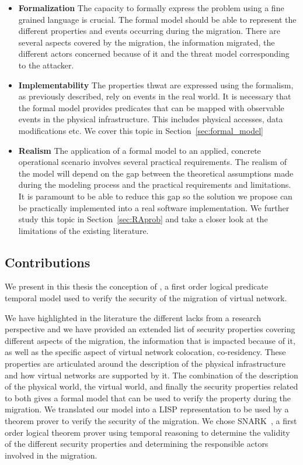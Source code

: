 \begin{itemize}
    \item \textbf{Formalization } The capacity to formally express the problem using a fine grained language is crucial. The formal model should be able to represent the different properties and events occurring during the migration.
    There are several aspects covered by the migration, the information migrated, the different actors concerned because of it and the threat model corresponding to the attacker.
    
    \item \textbf{Implementability } The properties thwat are expressed using the formalism, as previously described, rely on events in the real world. It is necessary that the formal model provides predicates that can be mapped with observable events in the physical infrastructure. This includes physical accesses, data modifications etc. We cover this topic in Section~\ref{sec:formal_model}
    
    \item \textbf{Realism } The application of a formal model to an applied, concrete operational scenario involves several practical requirements. The realism of the model will depend on the gap between the theoretical assumptions made during the modeling process and the practical requirements and limitations. It is paramount to be able to reduce this gap so the solution we propose can be practically implemented into a real software implementation. We further study this topic in Section~\ref{sec:RAprob} and take a closer look at the limitations of the existing literature. 
    
\end{itemize}


\subsection{Contributions}
We present in this thesis the conception of , a first order logical predicate temporal model used to verify the security of the migration of virtual network. 

We have highlighted in the literature the different lacks from a research perspective and we have provided an extended list of security properties covering different aspects of the migration, the information that is impacted because of it, as well as the specific aspect of virtual network colocation, \ie co-residency. These properties are articulated around the description of the physical infrastructure and how virtual networks are supported by it.
The combination of the description of the physical world, the virtual world, and finally the security properties related to both gives a formal model that can be used to verify the property during the migration. We translated our model into a LISP representation to be used by a theorem prover to verify the security of the migration. We chose SNARK~\cite{snark-Stickel2000}, a first order logical theorem prover using temporal reasoning to determine the validity of the different security properties and determining the responsible actors involved in the migration.

